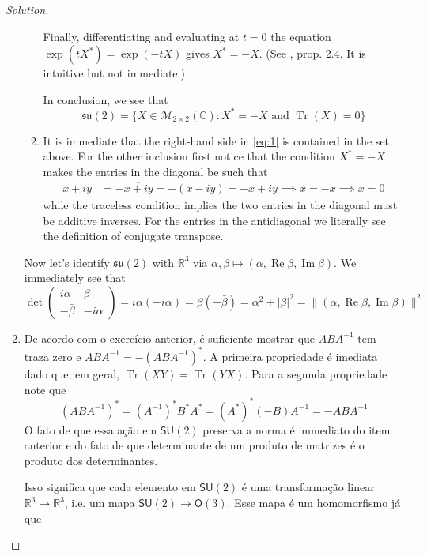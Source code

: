 \begin{proof}[Solution]
\begin{enumerate}[label=\alph*.]
\begin{enumerate}[label=\textbf{Step \arabic*}]
						Finally, differentiating and evaluating at $t=0$ the equation $\operatorname{exp}(tX^*) =\operatorname{exp}(-tX)$ gives $X^*=-X$. (See \cite{hall}, prop. 2.4. It is intuitive but not immediate.)

						In conclusion, we see that
						\[\mathfrak{su}(2)=\{X\in\mathcal{M}_{2\times 2}(\mathbb{C}):X^* =-X\text{ and }\operatorname{Tr}(X)=0 \}\]
		
					\item It is immediate that the right-hand side in \cref{eq:1} is contained in the set above. For the other inclusion first notice that the condition $X^*=-X$ makes the entries in the diagonal be such that
						\begin{align*}							x+iy&=-\overline{x+iy}=-(x-iy)=-x+iy\implies x=-x\implies x=0						\end{align*}
						while the traceless condition implies the two entries in the diagonal must be additive inverses. For the entries in the antidiagonal we literally see the definition of conjugate transpose.
				\end{enumerate}

Now let's identify $\mathfrak{su}(2)$ with $\mathbb{R}^{3}$ via $\alpha,\beta \mapsto (\alpha,\operatorname{Re}\beta,\operatorname{Im}\beta)$. We immediately see that
\[\det \begin{pmatrix} i\alpha&\beta\\-\bar{\beta} &-i\alpha\end{pmatrix} =i\alpha(-i\alpha)=\beta(-\bar{\beta} )=\alpha^2+|\beta|^2=\|(\alpha,\operatorname{Re}\beta,\operatorname{Im}\beta)\|^2\]

\item De acordo com o exercício anterior, é suficiente mostrar que $ABA^{-1}$ tem traza zero e $ABA^{-1}=-(ABA^{-1})^*$. A primeira propriedade é imediata dado que, em geral, $\operatorname{Tr}(XY)=\operatorname{Tr}(YX)$. Para a segunda propriedade note que
	\[(ABA^{-1})^*=(A^{-1})^*B^*A^*=(A^*)^*(-B)A^{-1}=-ABA^{-1}\]
	O fato de que essa ação em $\mathsf{SU}(2)$ preserva a norma é immediato do item anterior e do fato de que determinante de um produto de matrizes é o produto dos determinantes.

	Isso significa que cada elemento em $\mathsf{SU}(2)$ é uma transformação linear $\mathbb{R}^{3}\to \mathbb{R}^{3}$, i.e. um mapa $\mathsf{SU}(2)\to \mathsf{O}(3)$. Esse mapa é um homomorfismo já que 
\end{enumerate}
\end{proof}

